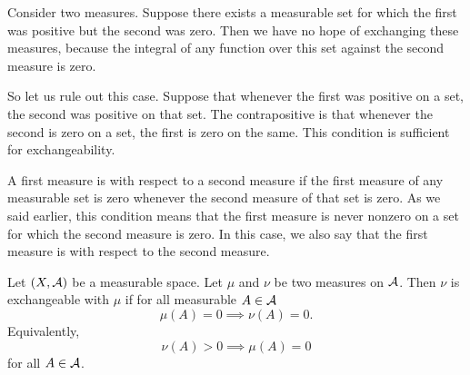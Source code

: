 
Consider two measures.
Suppose there exists
a measurable set for which the first
was positive but the second was zero.
Then we have no hope of exchanging
these measures, because the integral
of any function over this set against
the second measure is zero.

So let us rule out this case.
Suppose that whenever the
first was positive on a set,
the second was positive on that set.
The contrapositive is that
whenever the second is zero
on a set, the first is zero on the same.
This condition
is sufficient for exchangeability.

A first measure is 
with respect to a second measure
if the first measure of any measurable
set is zero whenever the second measure
of that set is zero.
As we said earlier, this condition
means that the first measure
is never nonzero on a set for which
the second measure is zero.
In this case, we also say that
the first measure is
with respect to the second measure.


Let $(X, \mathcal{A})$ be a measurable space.
Let $\mu$ and $\nu$ be two measures
on $\mathcal{A}$.
Then $\nu$ is exchangeable with $\mu$
if for all measurable $A \in \mathcal{A}$
\[
  \mu(A) = 0 \implies \nu(A) = 0.
\]
Equivalently,
\[
  \nu(A) > 0 \implies \mu(A) = 0
\]
for all $A \in \mathcal{A}$.
\strats
